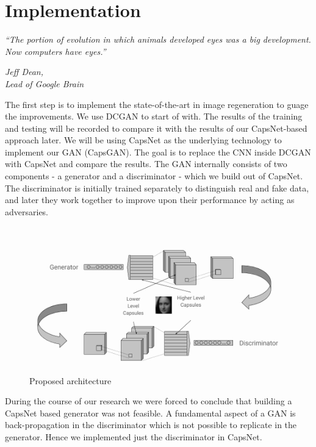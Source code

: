\chapter{Implementation}\label{ch:implementation}
\epigraph{\textit{ \normalsize“The portion of evolution in which animals developed eyes was a big development. Now computers have eyes.”}}{\normalsize\textit{Jeff Dean,\\ Lead of Google Brain}}


The first step is to implement the state-of-the-art in image regeneration to guage the improvements. We use DCGAN to start of with. The results of the training and testing will be recorded to compare it with the results of our CapsNet-based approach later. We will be using CapsNet as the underlying technology to implement our GAN (CapsGAN). The goal is to replace the CNN inside DCGAN with CapsNet and compare the results. The GAN internally consists of two components - a generator and a discriminator - which we build out of CapsNet. The discriminator is initially trained separately to distinguish real and fake data, and later they work together to improve upon their performance by acting as adversaries.
\par\bigskip

\begin{figure}[H]
\centering\includegraphics[width=1\textwidth]{images/methodology.png}
\caption{Proposed architecture}
\label{fig:capsgan}
\end{figure}

During the course of our research we were forced to conclude that building a CapsNet based generator was not feasible. A fundamental aspect of a GAN is back-propagation in the discriminator which is not possible to replicate in the generator. Hence we implemented just the discriminator in CapsNet. 
\par\bigskip

